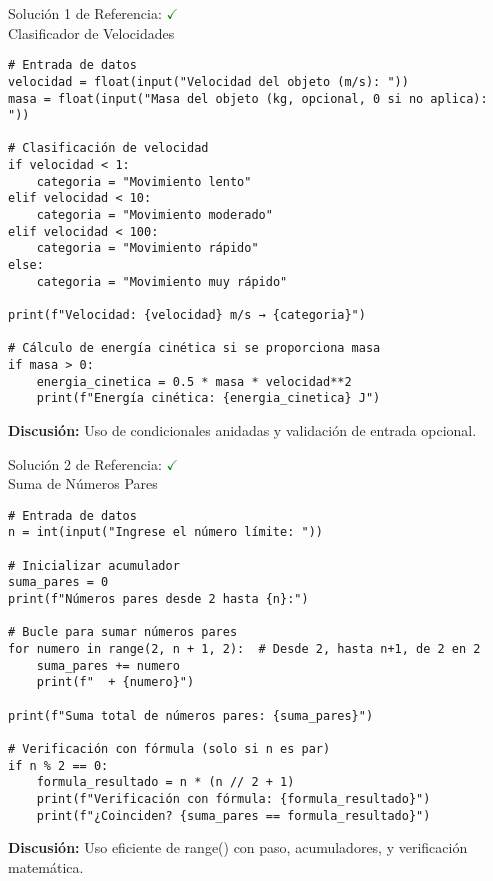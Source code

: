 \documentclass[10pt]{beamer}
\begin{document}
\begin{frame}[fragile]{Solución 1 de Referencia: \hfill \textcolor{green}{$\checkmark$} \\ Clasificador de Velocidades}
\begin{verbatim}
# Entrada de datos
velocidad = float(input("Velocidad del objeto (m/s): "))
masa = float(input("Masa del objeto (kg, opcional, 0 si no aplica): "))

# Clasificación de velocidad
if velocidad < 1:
    categoria = "Movimiento lento"
elif velocidad < 10:
    categoria = "Movimiento moderado"
elif velocidad < 100:
    categoria = "Movimiento rápido"
else:
    categoria = "Movimiento muy rápido"

print(f"Velocidad: {velocidad} m/s → {categoria}")

# Cálculo de energía cinética si se proporciona masa
if masa > 0:
    energia_cinetica = 0.5 * masa * velocidad**2
    print(f"Energía cinética: {energia_cinetica} J")
\end{verbatim}
\textbf{Discusión:} Uso de condicionales anidadas y validación de entrada opcional.
\end{frame}

\begin{frame}[fragile]{Solución 2 de Referencia: \hfill \textcolor{green}{$\checkmark$} \\ Suma de Números Pares}
\begin{verbatim}
# Entrada de datos
n = int(input("Ingrese el número límite: "))

# Inicializar acumulador
suma_pares = 0
print(f"Números pares desde 2 hasta {n}:")

# Bucle para sumar números pares
for numero in range(2, n + 1, 2):  # Desde 2, hasta n+1, de 2 en 2
    suma_pares += numero
    print(f"  + {numero}")

print(f"Suma total de números pares: {suma_pares}")

# Verificación con fórmula (solo si n es par)
if n % 2 == 0:
    formula_resultado = n * (n // 2 + 1)
    print(f"Verificación con fórmula: {formula_resultado}")
    print(f"¿Coinciden? {suma_pares == formula_resultado}")
\end{verbatim}
\textbf{Discusión:} Uso eficiente de range() con paso, acumuladores, y verificación matemática.
\end{frame}
\end{document}
